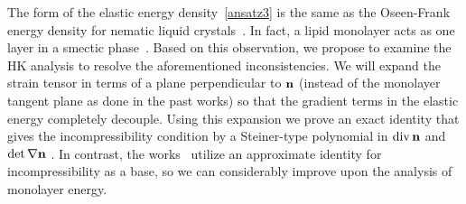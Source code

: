 
The form of the elastic energy density~\eqref{ansatz3} is the same as
the Oseen-Frank energy density for nematic liquid
crystals~\cite{ANDRIENKO2018520, Tran7106, Helfrich73}. In fact, a lipid
monolayer acts as one layer in a smectic phase~\cite{REYESMATEO1995978,
Rangamani20140463, PhysRevLett.113.248102}. Based on this observation,
we propose to examine the HK analysis to resolve the aforementioned
inconsistencies. We will expand the strain tensor in terms of a plane
perpendicular to ${\bf n}$ (instead of the monolayer tangent plane as
done in the past works) so that the gradient terms in the elastic energy
completely decouple. Using this expansion we prove an exact identity
that gives the incompressibility condition by a Steiner-type polynomial
in $\operatorname{div} {\bf n}$ and $\det \nabla {\bf n}$ \cite{Fe59}. In contrast,
the works~\cite{TerziDeserno17, PhysRevE.102.042406, Hamm2000,
C9SM02079A} utilize an approximate identity for incompressibility as a base,
so we can considerably improve upon the analysis of monolayer energy.

